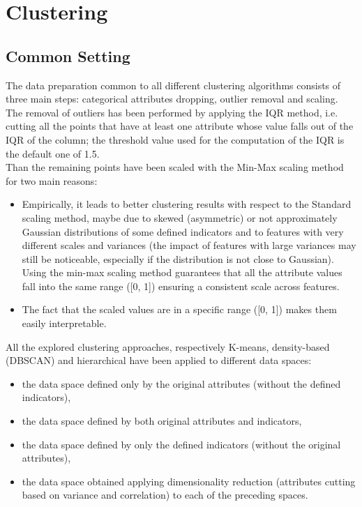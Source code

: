 \chapter{Clustering}


\section{Common Setting}

The data preparation common to all different clustering algorithms consists of three main steps: categorical attributes dropping, outlier removal and scaling.
The removal of outliers has been performed by applying the IQR method, i.e. cutting all the points that have at least one attribute whose value falls out of the IQR of the column; the threshold value used for the computation of the IQR is the default one of 1.5.\\
Than the remaining points have been scaled with the Min-Max scaling method for two main reasons:
\begin{itemize}
    \item Empirically, it leads to better clustering results with respect to the Standard scaling method, maybe due to skewed (asymmetric) or not approximately Gaussian distributions of some defined indicators and to features with very different scales and variances (the impact of features with large variances may still be noticeable, especially if the distribution is not close to Gaussian). Using the min-max scaling method guarantees that all the attribute values fall into the same range ([0, 1]) ensuring a consistent scale across features.
    \item The fact that the scaled values are in a specific range ([0, 1]) makes them easily interpretable.
\end{itemize}
All the explored clustering approaches, respectively K-means, density-based (DBSCAN) and hierarchical have been applied to different data spaces:
\begin{itemize}
    \item the data space defined only by the original attributes (without the defined indicators),
    \item the data space defined by both original attributes and indicators,
    \item the data space defined by only the defined indicators (without the original attributes),
    \item the data space obtained applying dimensionality reduction (attributes cutting based on variance and correlation) to each of the preceding spaces.
\end{itemize}
